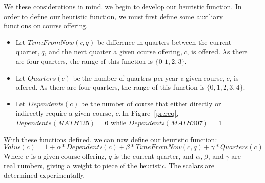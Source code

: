 \documentclass[11pt]{article} %
\begin{document}
We these considerations in mind, we begin to develop our heuristic function. In
order to define our heuristic function, we must first define some auxiliary
functions on course offering.  \begin{itemize} \item Let $TimeFromNow(c, q)$ be
difference in quarters between the current quarter, $q$, and the next quarter
a given course offering, $c$, is offered. As there are four quarters, the range
of this function is $\{0, 1, 2, 3\}$.  \item Let $Quarters(c)$ be the number of
quarters per year a given course, $c$, is offered. As there are four quarters,
the range of this function is $\{0, 1, 2, 3, 4\}$.  \item Let $Dependents(c)$ be
the number of course that either directly or indirectly require a given course,
$c$. In Figure~\ref{prereq}, $Dependents(MATH125)$ = 6 while
$Dependents(MATH307)$ = 1 \end{itemize}

With these functions defined, we can now define our heuristic function:
\begin{equation} Value(c) = 1 + \alpha * Dependents(c) + \beta * TimeFromNow(c,
q) + \gamma * Quarters(c) \end{equation} Where $c$ is a given course offering,
$q$ is the current quarter, and $\alpha$, $\beta$, and $\gamma$ are real
numbers, giving a weight to piece of the heuristic. The scalars are determined
experimentally.
\end{document}
